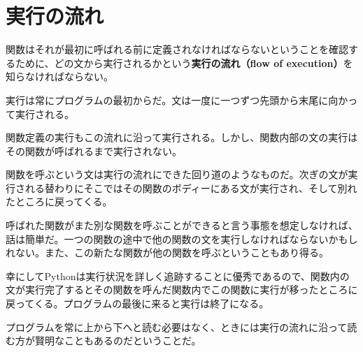\documentclass[a4j,12pt,makeidx]{jbook}
\begin{document}
\section{実行の流れ}
関数はそれが最初に呼ばれる前に定義されなければならないということを確認するために、どの文から実行されるかという{\bf 実行の流れ（flow of execution）}を知らなければならない。\par
実行は常にプログラムの最初からだ。文は一度に一つずつ先頭から末尾に向かって実行される。\par
関数定義の実行もこの流れに沿って実行される。しかし、関数内部の文の実行はその関数が呼ばれるまで実行されない。\par
関数を呼ぶという文は実行の流れにできた回り道のようなものだ。次ぎの文が実行される替わりにそこではその関数のボディーにある文が実行され、そして別れたところに戻ってくる。\par
呼ばれた関数がまた別な関数を呼ぶことができると言う事態を想定しなければ、話は簡単だ。一つの関数の途中で他の関数の文を実行しなければならないかもしれない。また、この新たな関数が他の関数を呼ぶということもあり得る。\par
幸にしてPythonは実行状況を詳しく追跡することに優秀であるので、関数内の文が実行完了するとその関数を呼んだ関数内でこの関数に実行が移ったところに戻ってくる。プログラムの最後に来ると実行は終了になる。\par
プログラムを常に上から下へと読む必要はなく、ときには実行の流れに沿って読む方が賢明なこともあるのだということだ。
%
\end{document}
